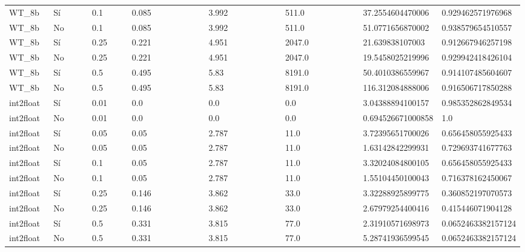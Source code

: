{{\begin{longtable}{M{0.09\linewidth}M{0.09\linewidth}M{0.09\linewidth}M{0.09\linewidth}M{0.09\linewidth}M{0.09\linewidth}M{0.09\linewidth}M{0.09\linewidth}M{0.09\linewidth}M{0.09\linewidth}M{0.09\linewidth}}
WT\_8b & Sí & \num{0.1} & \num{0.085} &   & \num{3.992} &   & \num{511.0} &   & \num{37.2554604470006} & \num{0.929462571976968} \\
WT\_8b & No & \num{0.1} & \num{0.085} &   & \num{3.992} &   & \num{511.0} &   & \num{51.0771656870002} & \num{0.938579654510557} \\
WT\_8b & Sí & \num{0.25} & \num{0.221} &   & \num{4.951} &   & \num{2047.0} &   & \num{21.639838107003} & \num{0.912667946257198} \\
WT\_8b & No & \num{0.25} & \num{0.221} &   & \num{4.951} &   & \num{2047.0} &   & \num{19.5458025219996} & \num{0.929942418426104} \\
WT\_8b & Sí & \num{0.5} & \num{0.495} &   & \num{5.83} &   & \num{8191.0} &   & \num{50.4010386559967} & \num{0.914107485604607} \\
WT\_8b & No & \num{0.5} & \num{0.495} &   & \num{5.83} &   & \num{8191.0} &   & \num{116.312084888006} & \num{0.916506717850288} \\
int2float & Sí & \num{0.01} & \num{0.0} &   & \num{0.0} &   & \num{0.0} &   & \num{3.04388894100157} & \num{0.985352862849534} \\
int2float & No & \num{0.01} & \num{0.0} &   & \num{0.0} &   & \num{0.0} &   & \num{0.694526671000858} & \num{1.0} \\
int2float & Sí & \num{0.05} & \num{0.05} &   & \num{2.787} &   & \num{11.0} &   & \num{3.72395651700026} & \num{0.656458055925433} \\
int2float & No & \num{0.05} & \num{0.05} &   & \num{2.787} &   & \num{11.0} &   & \num{1.63142842299931} & \num{0.729693741677763} \\
int2float & Sí & \num{0.1} & \num{0.05} &   & \num{2.787} &   & \num{11.0} &   & \num{3.32024084800105} & \num{0.656458055925433} \\
int2float & No & \num{0.1} & \num{0.05} &   & \num{2.787} &   & \num{11.0} &   & \num{1.55104450100043} & \num{0.716378162450067} \\
int2float & Sí & \num{0.25} & \num{0.146} &   & \num{3.862} &   & \num{33.0} &   & \num{3.32288925899775} & \num{0.360852197070573} \\
int2float & No & \num{0.25} & \num{0.146} &   & \num{3.862} &   & \num{33.0} &   & \num{2.67979254400416} & \num{0.415446071904128} \\
int2float & Sí & \num{0.5} & \num{0.331} &   & \num{3.815} &   & \num{77.0} &   & \num{2.31910571698973} & \num{0.0652463382157124} \\
int2float & No & \num{0.5} & \num{0.331} &   & \num{3.815} &   & \num{77.0} &   & \num{5.28741936599545} & \num{0.0652463382157124} \\

\end{longtable}}}
